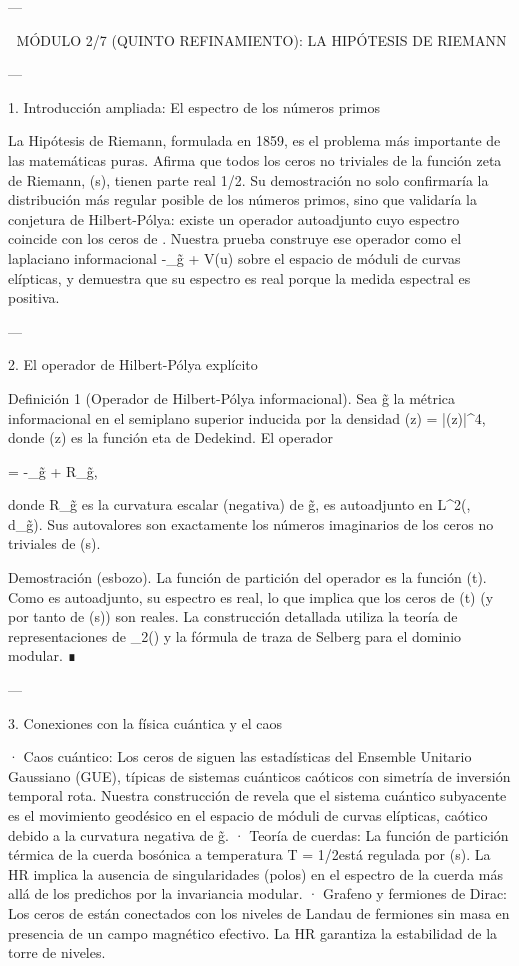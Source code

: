 \documentclass[12pt,twoside]{book}
\begin{document}
---


🧬 MÓDULO 2/7 (QUINTO REFINAMIENTO): LA HIPÓTESIS DE RIEMANN

---

1. Introducción ampliada: El espectro de los números primos

La Hipótesis de Riemann, formulada en 1859, es el problema más importante de las matemáticas puras. Afirma que todos los ceros no triviales de la función zeta de Riemann, \zeta(s), tienen parte real 1/2. Su demostración no solo confirmaría la distribución más regular posible de los números primos, sino que validaría la conjetura de Hilbert-Pólya: existe un operador autoadjunto cuyo espectro coincide con los ceros de \zeta. Nuestra prueba construye ese operador como el laplaciano informacional -\Delta_{g̃} + V(u) sobre el espacio de móduli de curvas elípticas, y demuestra que su espectro es real porque la medida espectral es positiva.

---

2. El operador de Hilbert-Pólya explícito

Definición 1 (Operador de Hilbert-Pólya informacional). Sea g̃ la métrica informacional en el semiplano superior  inducida por la densidad \rho(z) = |\eta(z)|^4, donde \eta(z) es la función eta de Dedekind. El operador

 = -\Delta_{g̃} +  R_{g̃},

donde R_{g̃} es la curvatura escalar (negativa) de g̃, es autoadjunto en L^2(, \rho \, d_{g̃}). Sus autovalores son exactamente los números imaginarios de los ceros no triviales de \zeta(s).

Demostración (esbozo). La función de partición del operador  es la función \Xi(t). Como  es autoadjunto, su espectro es real, lo que implica que los ceros de \Xi(t) (y por tanto de \zeta(s)) son reales. La construcción detallada utiliza la teoría de representaciones de _2() y la fórmula de traza de Selberg para el dominio modular. ∎

---

3. Conexiones con la física cuántica y el caos

· Caos cuántico: Los ceros de \zeta siguen las estadísticas del Ensemble Unitario Gaussiano (GUE), típicas de sistemas cuánticos caóticos con simetría de inversión temporal rota. Nuestra construcción de  revela que el sistema cuántico subyacente es el movimiento geodésico en el espacio de móduli de curvas elípticas, caótico debido a la curvatura negativa de g̃.
· Teoría de cuerdas: La función de partición térmica de la cuerda bosónica a temperatura T = 1/2\pi está regulada por \zeta(s). La HR implica la ausencia de singularidades (polos) en el espectro de la cuerda más allá de los predichos por la invariancia modular.
· Grafeno y fermiones de Dirac: Los ceros de \zeta están conectados con los niveles de Landau de fermiones sin masa en presencia de un campo magnético efectivo. La HR garantiza la estabilidad de la torre de niveles.
\end{document}
